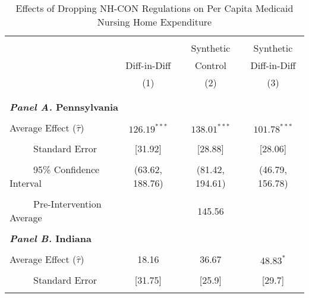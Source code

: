 \documentclass[../Main.tex]{subfiles}
\begin{document}
\newpage
\null
\vfill
\begin{table}[htbp]\centering \footnotesize
\def\sym#1{\ifmmode^{#1}\else\(^{#1}\)\fi}
\captionsetup{width=.8\textwidth}
\caption{\centering Effects of Dropping NH-CON Regulations on Per Capita Medicaid Nursing Home Expenditure}
\label{tab:ave_results_med_exp}
\setlength{\tabcolsep}{10pt}
\begin{tabular}{l*{3}{c}}
\hline\hline
\\[-2ex]
&\multicolumn{1}{c}{}&\multicolumn{1}{c}{Synthetic}&\multicolumn{1}{c}{Synthetic}\\
&\multicolumn{1}{c}{Diff-in-Diff}&\multicolumn{1}{c}{Control}&\multicolumn{1}{c}{Diff-in-Diff}\\
&\multicolumn{1}{c}{(1)}&\multicolumn{1}{c}{(2)}&\multicolumn{1}{c}{(3)}\\
\\[-2ex]
\hline
\\[-.1ex]
\multicolumn{4}{l}{\textbf{\textit{Panel A.} Pennsylvania}}\\
\\[-1.5ex]
\multicolumn{1}{l}{Average Effect ($\hat{\tau}$)}&   \multicolumn{1}{c}{$126.19^{***}$}&   \multicolumn{1}{c}{$138.01^{***}$}&  \multicolumn{1}{c}{$101.78^{***}$}\\
\\[-2ex]
\multicolumn{1}{l}{\ \ \ \ \ Standard Error}  &\multicolumn{1}{c}{[31.92]}&\multicolumn{1}{c}{[28.88]}&\multicolumn{1}{c}{[28.06]}\\
\\[-2ex]
\multicolumn{1}{l}{\ \ \ \ \ 95\% Confidence Interval}&   \multicolumn{1}{c}{(63.62, 188.76)}&   \multicolumn{1}{c}{(81.42, 194.61)}&   \multicolumn{1}{c}{(46.79, 156.78)}\\
\\[-2ex]
\multicolumn{1}{l}{\ \ \ \ \ Pre-Intervention Average}&   \multicolumn{3}{c}{145.56}\\
\\[-.1ex]
\multicolumn{4}{l}{\textbf{\textit{Panel B.} Indiana}}\\
\\[-1.5ex]
\multicolumn{1}{l}{Average Effect ($\hat{\tau}$)}&   \multicolumn{1}{c}{18.16}&   \multicolumn{1}{c}{36.67}&  \multicolumn{1}{c}{$48.83^{*}$}\\
\\[-2ex]
\multicolumn{1}{l}{\ \ \ \ \ Standard Error}  &\multicolumn{1}{c}{[31.75]}&\multicolumn{1}{c}{[25.9]}&\multicolumn{1}{c}{[29.7]}\\
\\[-2ex]

\end{tabular}
\end{table}
\end{document}
